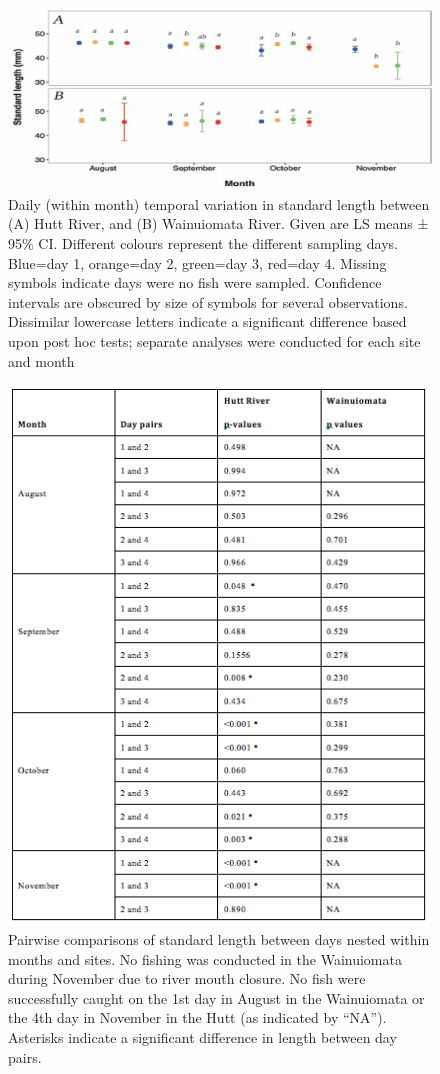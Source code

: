 \documentclass[]{book}
\begin{document}
\begin{figure}
\centering
\includegraphics{images/spatiotemp1.png}
\caption{\label{fig:spatiotemp1}Daily (within month) temporal variation in
standard length between (A) Hutt River, and (B) Wainuiomata River. Given
are LS means ± 95\% CI. Different colours represent the different
sampling days. Blue=day 1, orange=day 2, green=day 3, red=day 4. Missing
symbols indicate days were no fish were sampled. Confidence intervals
are obscured by size of symbols for several observations. Dissimilar
lowercase letters indicate a significant difference based upon post hoc
tests; separate analyses were conducted for each site and month}
\end{figure}

\begin{figure}
\centering
\includegraphics{images/spatiotemp1table.png}
\caption{\label{fig:spatiotemp1table}Pairwise comparisons of standard length
between days nested within months and sites. No fishing was conducted in
the Wainuiomata during November due to river mouth closure. No fish were
successfully caught on the 1st day in August in the Wainuiomata or the
4th day in November in the Hutt (as indicated by ``NA''). Asterisks
indicate a significant difference in length between day pairs.}
\end{figure}
\end{document}
